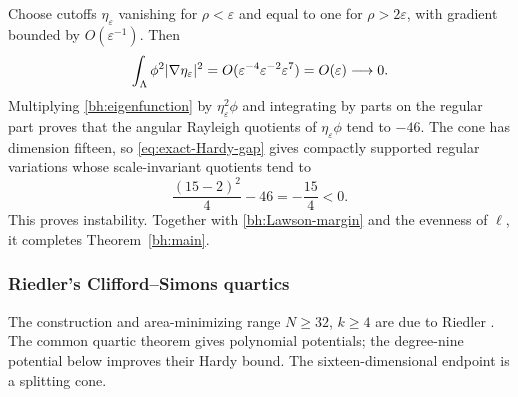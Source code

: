 Choose cutoffs $\eta_\varepsilon$ vanishing for $\rho<\varepsilon$
and equal to one for $\rho>2\varepsilon$, with gradient bounded by
$O(\varepsilon^{-1})$. Then
\[
 \int_\Lambda\phi^2\lvert \nabla\eta_\varepsilon\rvert^2
 =O(\varepsilon^{-4}\varepsilon^{-2}\varepsilon^7)
 =O(\varepsilon)\longrightarrow0.
\]
Multiplying \eqref{bh:eigenfunction} by
$\eta_\varepsilon^2\phi$ and integrating by parts on the regular
part proves that the angular Rayleigh quotients of
$\eta_\varepsilon\phi$ tend to $-46$. The cone has dimension fifteen,
so \eqref{eq:exact-Hardy-gap} gives compactly supported regular
variations whose scale-invariant quotients tend to
\begin{equation}\label{bh:negative-margin}
 \frac{(15-2)^2}{4}-46=-\frac{15}{4}<0.
\end{equation}
This proves instability. Together with \eqref{bh:Lawson-margin} and
the evenness of $\ell$, it completes Theorem~\ref{bh:main}.



\subsubsection{Riedler's Clifford--Simons quartics}

The construction and area-minimizing range
\(N\geq32\), \(k\geq4\) are due to Riedler
\cite[Section~5.2 and Theorem~5.2.5]{RiedlerThesis25}.
The common quartic theorem gives polynomial potentials; the
degree-nine potential below improves their Hardy bound. The
sixteen-dimensional endpoint is a splitting cone.

